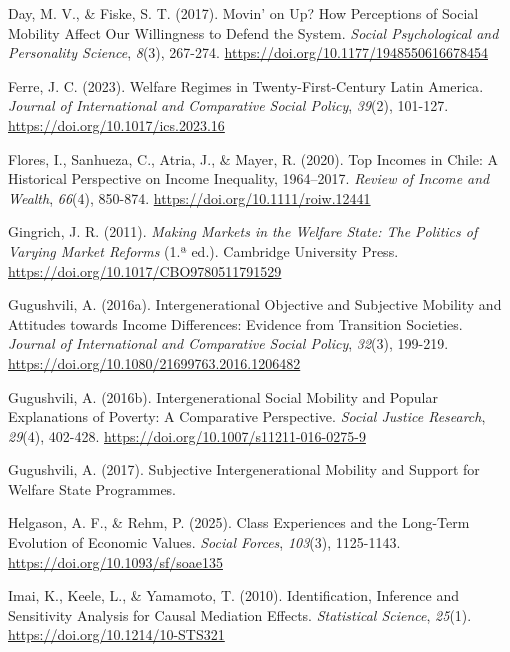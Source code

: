 \documentclass[
  spanish,
  letterpaper,
  DIV=11,
  numbers=noendperiod,
  oneside]{scrartcl}
\newlength{\cslhangindent}
\newenvironment{CSLReferences}[2] %
 {\begin{list}{}{%
  \setlength{\itemindent}{0pt}
  \setlength{\leftmargin}{0pt}
  \setlength{\parsep}{0pt}
  \ifodd #1
   \setlength{\leftmargin}{\cslhangindent}
   \setlength{\itemindent}{-1\cslhangindent}
  \fi
  \setlength{\itemsep}{#2\baselineskip}}}
 {\end{list}}
\begin{document}
\begin{CSLReferences}{1}{0}
Day, M. V., \& Fiske, S. T. (2017). Movin' on {Up}? {How Perceptions} of
{Social Mobility Affect Our Willingness} to {Defend} the {System}.
\emph{Social Psychological and Personality Science}, \emph{8}(3),
267-274. \url{https://doi.org/10.1177/1948550616678454}

Ferre, J. C. (2023). Welfare Regimes in Twenty-First-Century {Latin
America}. \emph{Journal of International and Comparative Social Policy},
\emph{39}(2), 101-127. \url{https://doi.org/10.1017/ics.2023.16}

Flores, I., Sanhueza, C., Atria, J., \& Mayer, R. (2020). Top {Incomes}
in {Chile}: {A Historical Perspective} on {Income Inequality},
1964--2017. \emph{Review of Income and Wealth}, \emph{66}(4), 850-874.
\url{https://doi.org/10.1111/roiw.12441}

Gingrich, J. R. (2011). \emph{Making {Markets} in the {Welfare State}:
{The Politics} of {Varying Market Reforms}} (1.ª ed.). Cambridge
University Press. \url{https://doi.org/10.1017/CBO9780511791529}

Gugushvili, A. (2016a). Intergenerational Objective and Subjective
Mobility and Attitudes towards Income Differences: Evidence from
Transition Societies. \emph{Journal of International and Comparative
Social Policy}, \emph{32}(3), 199-219.
\url{https://doi.org/10.1080/21699763.2016.1206482}

Gugushvili, A. (2016b). Intergenerational {Social Mobility} and {Popular
Explanations} of {Poverty}: {A Comparative Perspective}. \emph{Social
Justice Research}, \emph{29}(4), 402-428.
\url{https://doi.org/10.1007/s11211-016-0275-9}

Gugushvili, A. (2017). Subjective {Intergenerational Mobility} and
{Support} for {Welfare State Programmes}.

Helgason, A. F., \& Rehm, P. (2025). Class Experiences and the Long-Term
Evolution of Economic Values. \emph{Social Forces}, \emph{103}(3),
1125-1143. \url{https://doi.org/10.1093/sf/soae135}

Imai, K., Keele, L., \& Yamamoto, T. (2010). Identification, {Inference}
and {Sensitivity Analysis} for {Causal Mediation Effects}.
\emph{Statistical Science}, \emph{25}(1).
\url{https://doi.org/10.1214/10-STS321}


\end{CSLReferences}
\end{document}
